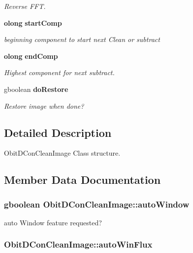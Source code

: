 \begin{CompactItemize}
\begin{CompactList}\small\item\em Reverse FFT. \item\end{CompactList}\item 
{\bf olong} {\bf start\-Comp}
\begin{CompactList}\small\item\em beginning component to start next Clean or subtract \item\end{CompactList}\item 
{\bf olong} {\bf end\-Comp}
\begin{CompactList}\small\item\em Highest component for next subtract. \item\end{CompactList}\item 
gboolean {\bf do\-Restore}
\begin{CompactList}\small\item\em Restore image when done? \item\end{CompactList}\end{CompactItemize}


\subsection{Detailed Description}
Obit\-DCon\-Clean\-Image Class structure. 



\subsection{Member Data Documentation}
\subsubsection{\setlength{\rightskip}{0pt plus 5cm}gboolean {\bf Obit\-DCon\-Clean\-Image::auto\-Window}}\label{structObitDConCleanImage_o35}


auto Window feature requested? 

\subsubsection{ {\bf Obit\-DCon\-Clean\-Image::auto\-Win\-Flux}}\label{structObitDConCleanImage_o31}


